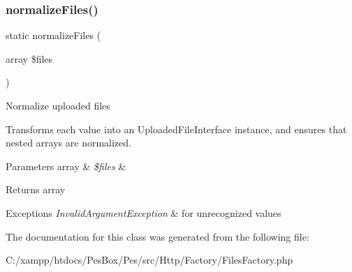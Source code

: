 \subsubsection{\texorpdfstring{normalize\+Files()}{normalizeFiles()}}
{\footnotesize\ttfamily static normalize\+Files (\begin{DoxyParamCaption}\item[{array}]{\$files }\end{DoxyParamCaption})\hspace{0.3cm}{\ttfamily [static]}}

Normalize uploaded files

Transforms each value into an Uploaded\+File\+Interface instance, and ensures that nested arrays are normalized.


\begin{DoxyParams}[1]{Parameters}
array & {\em \$files} & \\
\hline
\end{DoxyParams}
\begin{DoxyReturn}{Returns}
array 
\end{DoxyReturn}

\begin{DoxyExceptions}{Exceptions}
{\em Invalid\+Argument\+Exception} & for unrecognized values \\
\hline
\end{DoxyExceptions}


The documentation for this class was generated from the following file\+:\begin{DoxyCompactItemize}
\item 
C\+:/xampp/htdocs/\+Pes\+Box/\+Pes/src/\+Http/\+Factory/Files\+Factory.\+php\end{DoxyCompactItemize}
